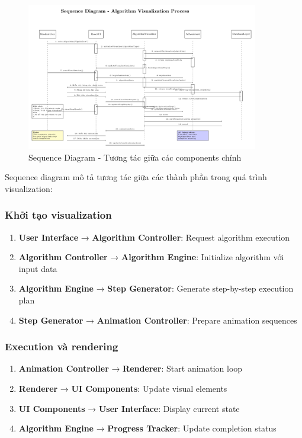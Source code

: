 \documentclass[12pt,a4paper]{article}
\begin{document}
\begin{figure}[H]
\centering
\includegraphics[width=0.9\textwidth]{diagrams/sequence_diagram.pdf}
\caption{Sequence Diagram - Tương tác giữa các components chính}
\label{fig:sequence_diagram}
\end{figure}

Sequence diagram mô tả tương tác giữa các thành phần trong quá trình visualization:

\subsubsection{Khởi tạo visualization}
\begin{enumerate}
    \item \textbf{User Interface} → \textbf{Algorithm Controller}: Request algorithm execution
    \item \textbf{Algorithm Controller} → \textbf{Algorithm Engine}: Initialize algorithm với input data
    \item \textbf{Algorithm Engine} → \textbf{Step Generator}: Generate step-by-step execution plan
    \item \textbf{Step Generator} → \textbf{Animation Controller}: Prepare animation sequences
\end{enumerate}

\subsubsection{Execution và rendering}
\begin{enumerate}
    \item \textbf{Animation Controller} → \textbf{Renderer}: Start animation loop
    \item \textbf{Renderer} → \textbf{UI Components}: Update visual elements
    \item \textbf{UI Components} → \textbf{User Interface}: Display current state
    \item \textbf{Algorithm Engine} → \textbf{Progress Tracker}: Update completion status
\end{enumerate}
\end{document}
